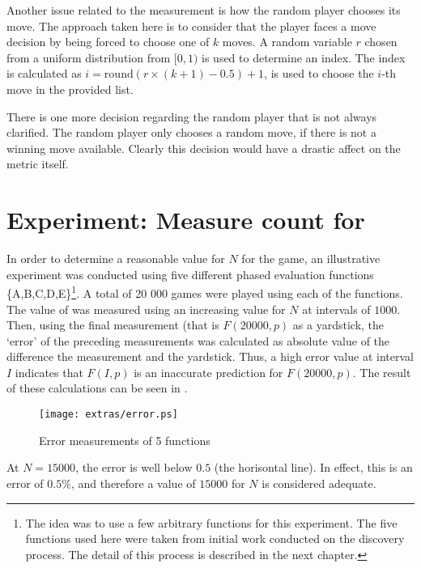 Another issue related to the measurement is how the random player chooses its move.  The approach taken here is to consider that the player faces a move decision by being forced to choose one of $k$ moves.  A random variable $r$ chosen from a uniform distribution from $[0,1)$ is used to determine an index.  The index is calculated as $i = \mbox{round}(r \times (k+1) - 0.5) + 1$, is used to choose the $i$-th move in the provided list.

There is one more decision regarding the random player that is not always clarified.  The random player only chooses a random move, if there is not a winning move available. Clearly this decision would have a drastic affect on the metric itself. 

\section{Experiment: Measure count for }
In order to determine a reasonable value for $N$ for the  game, an illustrative experiment was conducted using five different phased evaluation functions \{A,B,C,D,E\}\footnote{The idea was to use a few arbitrary functions for this experiment. The five functions used here were taken from initial work conducted on the discovery process. The detail of this process is described in the next chapter.}. A total of 20 000 games were played using each of the functions. The value of  was measured using an increasing value for $N$ at intervals of  $1000$.  Then, using the final measurement (that is $F(20000,p)$ as a yardstick, the `error' of the preceding measurements was calculated as absolute value of the difference the measurement and the yardstick.  Thus, a high error value at interval $I$ indicates that $F(I,p)$ is an inaccurate prediction for $F(20000,p)$.  The result of these calculations can be seen in .
\begin{figure}[htp]
	\centering
		\texttt{[image: extras/error.ps]}
	\caption{Error measurements of 5 functions}
	\label{fig:error}
\end{figure}
At $N = 15000$, the error is well below $0.5$ (the horisontal line). In effect, this is an error of $0.5\%$, and therefore a value of $15000$ for $N$ is considered adequate.



